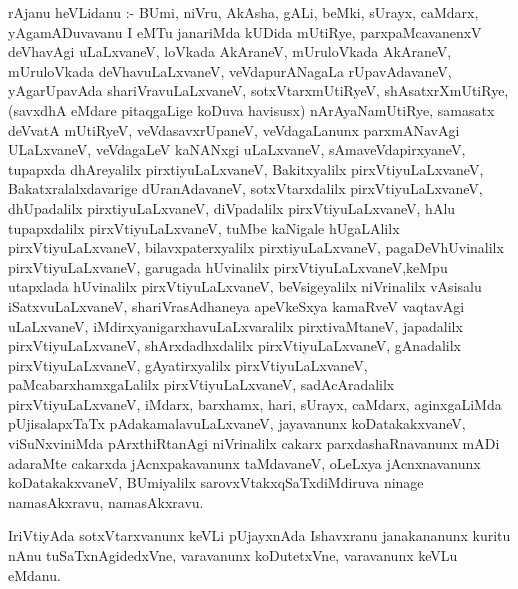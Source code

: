\documentclass{article}
\begin{document}
\begin{mn}
rAjanu  heVLidanu :- BUmi,  niVru,  AkAsha,  gALi,  beMki,  sUrayx,  caMdarx,  yAgamADuvavanu  I  eMTu  janariMda  kUDida  mUtiRye,  
parxpaMcavanenxV  deVhavAgi  uLaLxvaneV,  loVkada  AkAraneV,  mUruloVkada  AkAraneV,  mUruloVkada  deVhavuLaLxvaneV,  veVdapurANagaLa  
rUpavAdavaneV, yAgarUpavAda  shariVravuLaLxvaneV,  sotxVtarxmUtiRyeV,  shAsatxrXmUtiRye,  (savxdhA  eMdare  pitaqgaLige  koDuva  
havisusx) nArAyaNamUtiRye,  samasatx  deVvatA mUtiRyeV,  veVdasavxrUpaneV,  veVdagaLanunx  parxmANavAgi  ULaLxvaneV,  veVdagaLeV  
kaNANxgi  uLaLxvaneV,  sAmaveVdapirxyaneV,  tupapxda  dhAreyalilx  pirxtiyuLaLxvaneV,  Bakitxyalilx  pirxVtiyuLaLxvaneV,  
Bakatxralalxdavarige  dUranAdavaneV,  sotxVtarxdalilx  pirxVtiyuLaLxvaneV,  dhUpadalilx  pirxtiyuLaLxvaneV,  diVpadalilx  
pirxVtiyuLaLxvaneV,  hAlu  tupapxdalilx  pirxVtiyuLaLxvaneV,  tuMbe kaNigale  hUgaLAlilx  pirxVtiyuLaLxvaneV,  bilavxpaterxyalilx  
pirxtiyuLaLxvaneV,  pagaDeVhUvinalilx  pirxVtiyuLaLxvaneV,  garugada  hUvinalilx  pirxVtiyuLaLxvaneV,keMpu  utapxlada  hUvinalilx  
pirxVtiyuLaLxvaneV,  beVsigeyalilx  niVrinalilx  vAsisalu  iSatxvuLaLxvaneV,  shariVrasAdhaneya  apeVkeSxya  kamaRveV  vaqtavAgi  
uLaLxvaneV,  iMdirxyanigarxhavuLaLxvaralilx  pirxtivaMtaneV,  japadalilx  pirxVtiyuLaLxvaneV,  shArxdadhxdalilx  pirxVtiyuLaLxvaneV,  
gAnadalilx  pirxVtiyuLaLxvaneV,  gAyatirxyalilx  pirxVtiyuLaLxvaneV,  paMcabarxhamxgaLalilx  pirxVtiyuLaLxvaneV,  sadAcAradalilx  
pirxVtiyuLaLxvaneV,  iMdarx,  barxhamx,  hari,  sUrayx,  caMdarx,  aginxgaLiMda  pUjisalapxTaTx  pAdakamalavuLaLxvaneV,  jayavanunx  
koDatakakxvaneV,  viSuNxviniMda  pArxthiRtanAgi  niVrinalilx  cakarx  parxdashaRnavanunx  mADi  adaraMte  cakarxda  jAcnxpakavanunx  
taMdavaneV,  oLeLxya  jAcnxnavanunx  koDatakakxvaneV,  BUmiyalilx  sarovxVtakxqSaTxdiMdiruva  ninage  namasAkxravu,  namasAkxravu.
\end{mn}

\begin{mn}
IriVtiyAda  sotxVtarxvanunx  keVLi  pUjayxnAda  Ishavxranu  janakananunx  kuritu  nAnu  tuSaTxnAgidedxVne,  varavanunx  koDutetxVne,  
varavanunx  keVLu  eMdanu.
\end{mn}
\end{document}
